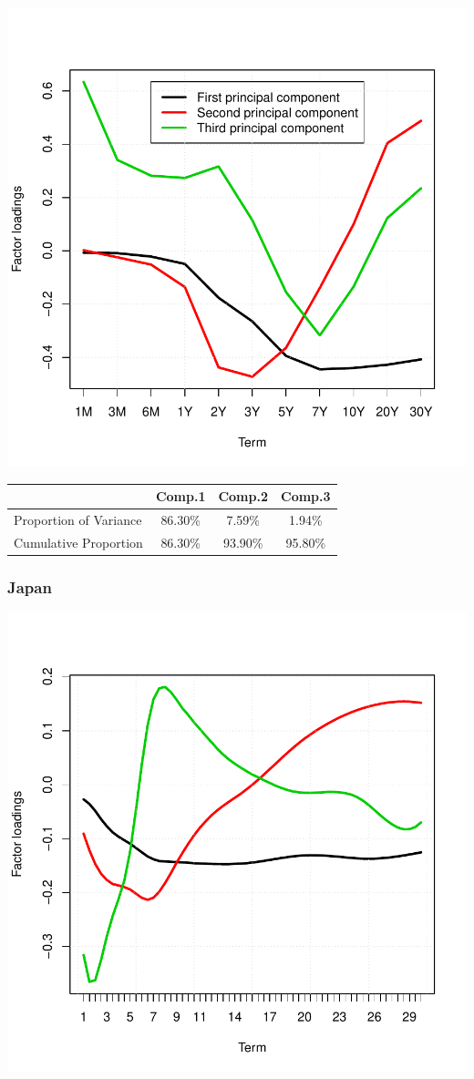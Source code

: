 \documentclass{article}
\begin{document}
\begin{spacing}{1.5}
\includegraphics{Graduation_Paper-026}
\begin{center}
\begin{tabular}{|l||c||c||c|}\hline
                        & Comp.1 & Comp.2 & Comp.3 \\ \hline
Proportion of Variance  & 86.30\%& 7.59\% & 1.94\% \\ \hline
Cumulative Proportion   & 86.30\%&93.90\% & 95.80\%\\ \hline
\end{tabular}
\end{center}

 \subsubsection{Japan}

\includegraphics{Graduation_Paper-028}


\end{spacing}
\end{document}
